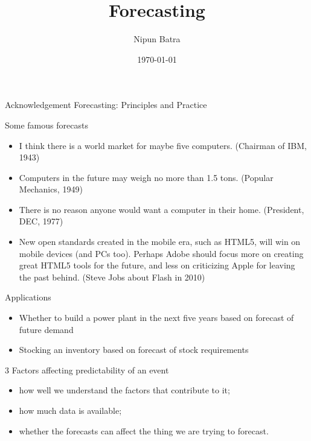 \documentclass{beamer}
\title{Forecasting}
\date{\today}
\author{Nipun Batra}
\institute{IIT Gandhinagar}
\begin{document}
  \maketitle

 \begin{frame}{Acknowledgement}
 Forecasting: Principles and Practice

\end{frame}

\begin{frame}{Some famous forecasts}
\begin{itemize}
\item I think there is a world market for maybe five computers. (Chairman of IBM, 1943)
	\item Computers in the future may weigh no more than 1.5 tons. (Popular Mechanics, 1949)
	\pause
\item There is no reason anyone would want a computer in their home. (President, DEC, 1977)
	\item New open standards created in the mobile era, such as HTML5, will win on mobile devices (and PCs too). Perhaps Adobe should focus more on creating great HTML5 tools for the future, and less on criticizing Apple for leaving the past behind. (Steve Jobs about Flash in 2010)
\end{itemize}
\end{frame}

\begin{frame}{Applications}
\begin{itemize}
\item Whether to build a power plant in the next five years based on forecast of future demand 
	\item Stocking an inventory based on forecast of stock requirements
\end{itemize}
\end{frame}

\begin{frame}{3 Factors affecting predictability of an event}
\begin{itemize}
\item how well we understand the factors that contribute to it;
\item how much data is available;
\pause
\item whether the forecasts can affect the thing we are trying to forecast.
\end{itemize}

\end{frame}
\end{document}
